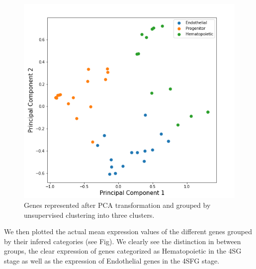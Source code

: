 \documentclass[a4paper,12pt]{book}
\theoremstyle{break}
\begin{document}
	\begin{figure}[h!]
		\centering
		\includegraphics[height = 0.4\textheight]{../Preliminary/genepca.png}
		\caption{Genes represented after PCA transformation and grouped by unsupervised clustering into three clusters.}
		\label{fig:genePCA}
	\end{figure}
		We then plotted the actual mean expression values of the different genes grouped by their infered categories (see Fig). We clearly see the distinction in between groups, the clear expression of genes categorized as Hematopoietic in the 4SG stage as well as the expression of Endothelial genes in the 4SFG stage. 
\end{document}
